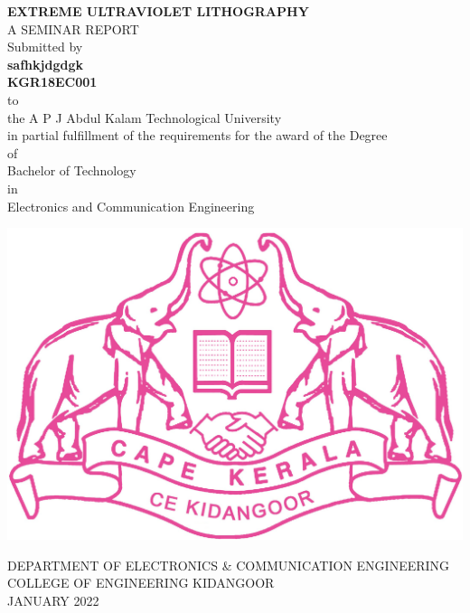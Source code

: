 \documentclass[12pt,a4paper]{report}
\begin{document}
\begin{center}
{\Large \textbf{EXTREME ULTRAVIOLET LITHOGRAPHY}}\\
\vspace{2cm}
A SEMINAR REPORT\\
\vspace{0.5cm}
Submitted by \\
\vspace{1cm}
\textbf{safhkjdgdgk}\\
\vspace{0.2cm}
\textbf{KGR18EC001}\\
\vspace{0.2cm} to\\


 the A P J Abdul Kalam Technological University \\
in partial fulfillment of the requirements for the award 
of the Degree \\
of\\
Bachelor of Technology \\
in\\
Electronics and Communication Engineering
\end{center}


\begin{center}

\vspace{1.2cm}

\includegraphics[scale=0.3]{ceklogo.jpg}

DEPARTMENT OF ELECTRONICS \& COMMUNICATION ENGINEERING\\

COLLEGE OF ENGINEERING KIDANGOOR\\

JANUARY 2022\\
\end{center}
\end{document}
